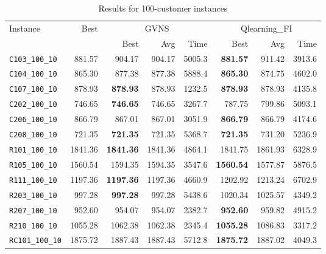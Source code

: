\begin{table}[ht]
\centering
\small
\setlength{\tabcolsep}{5pt}
\caption{Results for 100-customer instances}
\vspace{4mm}
\begin{adjustbox}{width=\textwidth}
\begin{tabular}{l r r r r @{\hspace{8pt}} r r r @{\hspace{8pt}}}
\toprule
\multirow{2}{*}{Instance} & \multirow{2}{*}{Best} & \multicolumn{3}{c}{GVNS} & \multicolumn{3}{c}{Qlearning\_FI} \\
\cmidrule(lr){3-5} \cmidrule(lr){6-8}
 &  & Best & Avg & Time & Best & Avg & Time \\
\midrule
\texttt{C103\_100\_10} & 881.57 & 904.17 & 904.17 & 5005.3 & \textbf{881.57} & 911.42 & 3913.6 \\
\texttt{C104\_100\_10} & 865.30 & 877.38 & 877.38 & 5888.4 & \textbf{865.30} & 874.75 & 4602.0 \\
\texttt{C107\_100\_10} & 878.93 & \textbf{878.93} & 878.93 & 1232.5 & \textbf{878.93} & 878.93 & 4135.8 \\
\texttt{C202\_100\_10} & 746.65 & \textbf{746.65} & 746.65 & 3267.7 & 787.75 & 799.86 & 5093.1 \\
\texttt{C206\_100\_10} & 866.79 & 867.01 & 867.01 & 3051.9 & \textbf{866.79} & 866.79 & 4174.6 \\
\texttt{C208\_100\_10} & 721.35 & \textbf{721.35} & 721.35 & 5368.7 & \textbf{721.35} & 731.20 & 5236.9 \\
\texttt{R101\_100\_10} & 1841.36 & \textbf{1841.36} & 1841.36 & 4864.1 & 1841.75 & 1861.93 & 6328.9 \\
\texttt{R105\_100\_10} & 1560.54 & 1594.35 & 1594.35 & 3547.6 & \textbf{1560.54} & 1577.87 & 5876.5 \\
\texttt{R111\_100\_10} & 1197.36 & \textbf{1197.36} & 1197.36 & 4660.9 & 1202.92 & 1213.24 & 6702.9 \\
\texttt{R203\_100\_10} & 997.28 & \textbf{997.28} & 997.28 & 5438.6 & 1020.34 & 1025.57 & 4349.2 \\
\texttt{R207\_100\_10} & 952.60 & 954.07 & 954.07 & 2382.7 & \textbf{952.60} & 959.82 & 4915.2 \\
\texttt{R210\_100\_10} & 1055.28 & 1062.38 & 1062.38 & 2345.4 & \textbf{1055.28} & 1086.83 & 3317.2 \\
\texttt{RC101\_100\_10} & 1875.72 & 1887.43 & 1887.43 & 5712.8 & \textbf{1875.72} & 1887.02 & 4049.3 \\

\end{tabular}
\end{adjustbox}
\end{table}
